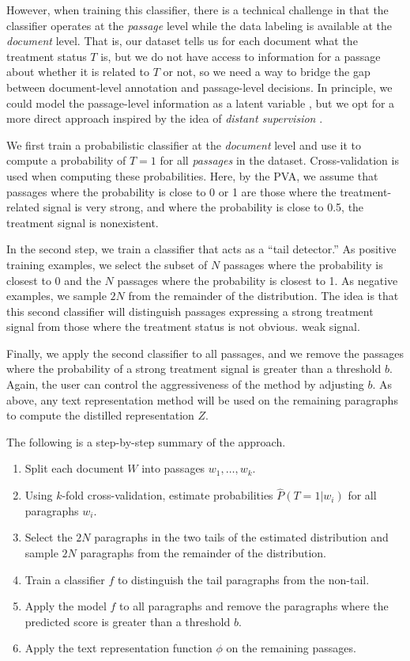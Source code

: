 \documentclass[11pt]{article}
\begin{document}
However, when training this classifier, there is a technical challenge in that the classifier operates at the \emph{passage} level while the data labeling is available at the \emph{document} level. That is, our dataset tells us for each document what the treatment status $T$ is, but we do not have access to information for a passage about whether it is related to $T$ or not, so
we need a way to bridge the gap between document-level annotation and passage-level decisions.
In principle, we could model the passage-level information as a latent variable \citep{tackstrom2011}, but we opt for a more direct approach inspired by the idea of \emph{distant supervision} \citep{mintz2009}.

We first train a probabilistic classifier at the \emph{document} level and use it to compute a probability of $T=1$ for all \emph{passages} in the dataset. Cross-validation is used when computing these probabilities. Here, by the PVA, we assume that passages where the probability is close to 0 or 1 are those where the treatment-related signal is very strong, and where the probability is close to 0.5, the treatment signal is nonexistent.

In the second step, we train a classifier that acts as a ``tail detector.'' As positive training examples, we select the subset of $N$ passages where the probability is closest to 0 and the $N$ passages where the probability is closest to 1. As negative examples, we sample $2N$ from the remainder of the distribution.
The idea is that this second classifier will distinguish passages expressing a strong treatment signal from those where the treatment status is not obvious. weak signal.

Finally, we apply the second classifier to all passages, and we remove the passages where the probability of a strong treatment signal is greater than a threshold $b$. Again, the user can control the aggressiveness of the method by adjusting $b$.
As above, any text representation method will be used on the remaining paragraphs to compute the distilled representation $Z$.

The following is a step-by-step summary of the approach.
\begin{enumerate}%
    \item Split each document $W$ into passages $w_1, \ldots, w_k$.
    \item Using $k$-fold cross-validation, estimate probabilities $\hat{P}(T=1|w_i)$ for all paragraphs $w_i$.
    \item Select the $2 N$ paragraphs in the two tails of the estimated distribution and sample $2 N$ paragraphs from the remainder of the distribution.
    \item Train a classifier $f$ to distinguish the tail paragraphs from the non-tail.
    \item Apply the model $f$ to all paragraphs and remove the paragraphs where the predicted score is greater than a threshold $b$.
    \item Apply the text representation function $\phi$ on the remaining passages.
\end{enumerate}
\end{document}

